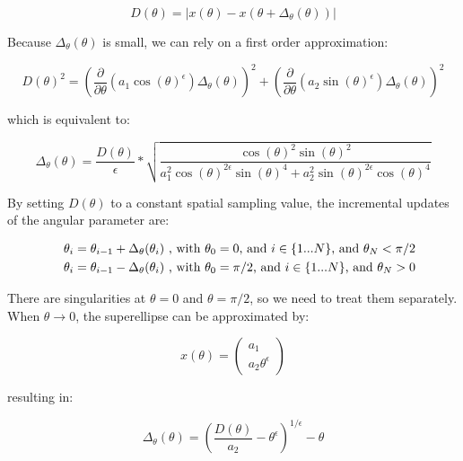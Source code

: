 \documentclass{article}
\begin{document}
\begin{equation}
D (\theta) = | x(\theta) - x(\theta + \Delta_\theta(\theta)) |
\end{equation}

Because $\Delta_\theta(\theta)$ is small, we can rely on a first order approximation:

\begin{equation}
D(\theta)^2 = \left( \frac{\partial}{\partial \theta} (a_1 \cos (\theta)^\epsilon) \Delta_\theta (\theta) \right)^2 + 
\left( \frac{\partial}{\partial \theta} (a_2 \sin (\theta)^\epsilon) \Delta_\theta (\theta) \right)^2
\end{equation}

which is equivalent to:

\begin{equation}
\Delta_\theta (\theta) = \frac{D(\theta)}{\epsilon} * \sqrt {\frac{ \cos (\theta) ^2 \sin (\theta) ^2} {a_1^2 \cos (\theta)^{2\epsilon} \sin(\theta)^4 + a_2^2 \sin (\theta)^{2\epsilon} \cos(\theta)^4}}
\end{equation}

By setting $D(\theta)$ to a constant spatial sampling value, the incremental updates of the angular parameter are:

\begin{eqnarray}
&& \theta_i = \theta_{i-1} + \Delta_\theta (\theta_i) \textnormal{ , with } \theta_0 = 0 \textnormal{, and } i \in \{ 1 ... N \} \textnormal {, and } \theta_N < \pi / 2 \\
&& \theta_i = \theta_{i-1} - \Delta_\theta (\theta_i) \textnormal{ , with } \theta_0 = \pi/2 \textnormal{, and } i \in \{ 1 ... N \} \textnormal {, and } \theta_N > 0
\end{eqnarray}

There are singularities at $\theta = 0$ and $\theta = \pi/2$, so we need to treat them separately. When $\theta \rightarrow 0$, the superellipse can be approximated by:

\begin{equation}
x (\theta) = \begin{pmatrix} a_1 \\ a_2 \theta ^\epsilon \end{pmatrix}
\end{equation}

resulting in:

\begin{equation}
\Delta_\theta (\theta) = \left(\frac{D (\theta)}{a_2} - \theta^\epsilon \right)^{1/\epsilon} - \theta
\end{equation}
\end{document}

